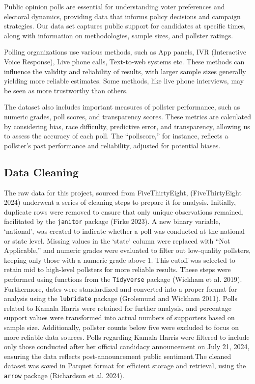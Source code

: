 \documentclass[
  letterpaper,
  DIV=11,
  numbers=noendperiod]{scrartcl}
\begin{document}
Public opinion polls are essential for understanding voter preferences
and electoral dynamics, providing data that informs policy decisions and
campaign strategies. Our data set captures public support for candidates
at specific times, along with information on methodologies, sample
sizes, and pollster ratings.

Polling organizations use various methods, such as App panels, IVR
(Interactive Voice Response), Live phone calls, Text-to-web systems etc.
These methods can influence the validity and reliability of results,
with larger sample sizes generally yielding more reliable estimates.
Some methods, like live phone interviews, may be seen as more
trustworthy than others.

The dataset also includes important measures of pollster performance,
such as numeric grades, poll scores, and transparency scores. These
metrics are calculated by considering bias, race difficulty, predictive
error, and transparency, allowing us to assess the accuracy of each
poll. The ``pollscore,'' for instance, reflects a pollster's past
performance and reliability, adjusted for potential biases.

\vspace{0.7cm}

\hypertarget{data-cleaning}{%
\subsection{Data Cleaning}\label{data-cleaning}}

The raw data for this project, sourced from FiveThirtyEight,
(FiveThirtyEight 2024) underwent a series of cleaning steps to prepare
it for analysis. Initially, duplicate rows were removed to ensure that
only unique observations remained, facilitated by the \texttt{janitor}
package (Firke 2023). A new binary variable, `national', was created to
indicate whether a poll was conducted at the national or state level.
Missing values in the `state' column were replaced with ``Not
Applicable,'' and numeric grades were evaluated to filter out
low-quality pollsters, keeping only those with a numeric grade above 1.
This cutoff was selected to retain mid to high-level pollsters for more
reliable results. These steps were performed using functions from the
\texttt{Tidyverse} package (Wickham et al. 2019). Furthermore, dates
were standardized and converted into a proper format for analysis using
the \texttt{lubridate} package (Grolemund and Wickham 2011). Polls
related to Kamala Harris were retained for further analysis, and
percentage support values were transformed into actual numbers of
supporters based on sample size. Additionally, pollster counts below
five were excluded to focus on more reliable data sources. Polls
regarding Kamala Harris were filtered to include only those conducted
after her official candidacy announcement on July 21, 2024, ensuring the
data reflects post-announcement public sentiment.The cleaned dataset was
saved in Parquet format for efficient storage and retrieval, using the
\texttt{arrow} package (Richardson et al. 2024).
\end{document}
